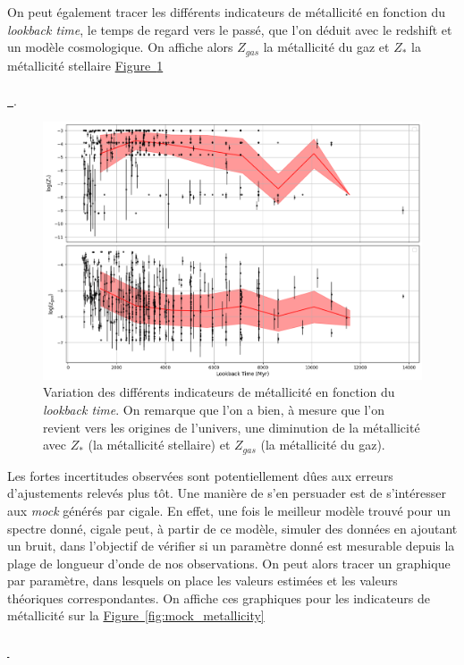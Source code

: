 \documentclass[12pt, a4paper]{article}
\newcommand*{\figref}[2][]{%
  \hyperref[{#2}]{%
    Figure~\ref*{#2}%
    \ifx\\#1\\%
    \else
      \,#1%
    \fi
  }%
}
\begin{document}
On peut également tracer les différents indicateurs de métallicité en fonction du \textit{lookback time}, le temps de regard vers le passé, que l'on déduit avec le redshift et un modèle cosmologique. On affiche alors $Z_{gas}$ la métallicité du gaz et $Z_*$ la métallicité stellaire \figref{fig:metallicite_age}.

\begin{figure}[!h]
  \centering
  \includegraphics[width=1\textwidth]{assets/metallicite_w_age.png}
  \caption{Variation des différents indicateurs de métallicité en fonction du \textit{lookback time}. On remarque que l'on a bien, à mesure que l'on revient vers les origines de l'univers, une diminution de la métallicité avec $Z_*$ (la métallicité stellaire) et $Z_{gas}$ (la métallicité du gaz).}
  \label{fig:metallicite_age}
\end{figure}

Les fortes incertitudes observées sont potentiellement dûes aux erreurs d'ajustements relevés plus tôt. Une manière de s'en persuader est de s'intéresser aux \textit{mock} générés par \gls{cigale}. En effet, une fois le meilleur modèle trouvé pour un spectre donné, \gls{cigale} peut, à partir de ce modèle, simuler des données en ajoutant un bruit, dans l'objectif de vérifier si un paramètre donné est mesurable depuis la plage de longueur d'onde de nos observations. On peut alors tracer un graphique par paramètre, dans lesquels on place les valeurs estimées et les valeurs théoriques correspondantes. On affiche ces graphiques pour les indicateurs de métallicité sur la \figref{fig:mock_metallicity}
\end{document}
